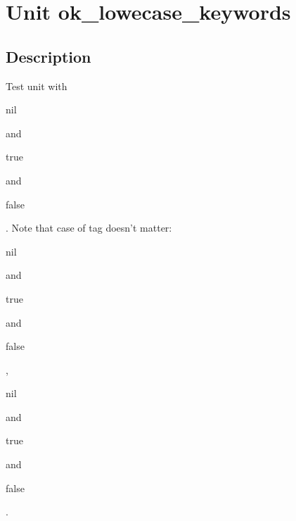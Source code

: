 \documentclass{report}
\begin{document}
\label{toc}\tableofcontents
\newpage
\newlength{\tmplength}
\chapter{Unit ok{\_}lowecase{\_}keywords}
\label{ok_lowecase_keywords}
\section{Description}
Test unit with \begin{ttfamily}nil\end{ttfamily} and \begin{ttfamily}true\end{ttfamily} and \begin{ttfamily}false\end{ttfamily}. Note that case of tag doesn't matter: \begin{ttfamily}nil\end{ttfamily} and \begin{ttfamily}true\end{ttfamily} and \begin{ttfamily}false\end{ttfamily} , \begin{ttfamily}nil\end{ttfamily} and \begin{ttfamily}true\end{ttfamily} and \begin{ttfamily}false\end{ttfamily} .
\end{document}
